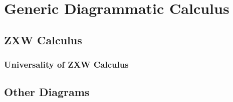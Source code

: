 \chapter{Generic Diagrammatic Calculus} \label{ch:generic_diagram}
\section{ZXW Calculus}

\subsection{Universality of ZXW Calculus}

\section{Other Diagrams}
